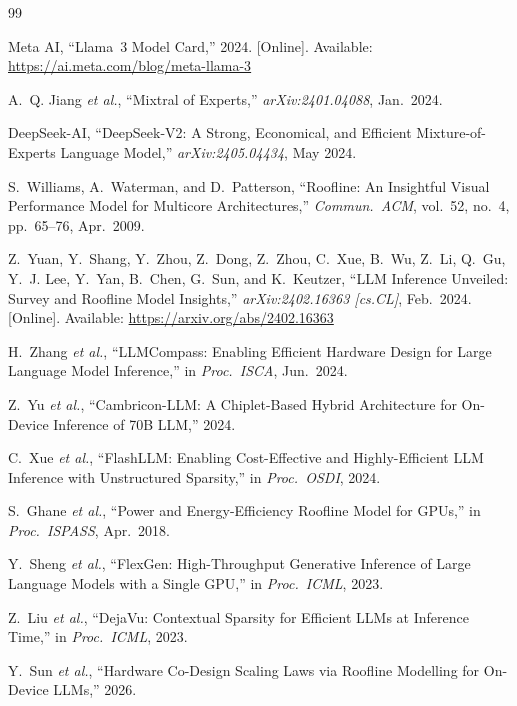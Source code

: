 \documentclass[journal]{IEEEtran}
\begin{document}
\begin{thebibliography}{99}

Meta AI, ``Llama~3 Model Card,'' 2024.
[Online]. Available: \url{https://ai.meta.com/blog/meta-llama-3}

A.~Q. Jiang \textit{et al.}, ``Mixtral of Experts,''
\textit{arXiv:2401.04088}, Jan.\ 2024.

DeepSeek-AI, ``DeepSeek-V2: A Strong, Economical, and Efficient
Mixture-of-Experts Language Model,''
\textit{arXiv:2405.04434}, May 2024.

S.~Williams, A.~Waterman, and D.~Patterson,
``Roofline: An Insightful Visual Performance Model for Multicore
Architectures,''
\textit{Commun.~ACM}, vol.~52, no.~4, pp.~65--76, Apr.\ 2009.

Z.~Yuan, Y.~Shang, Y.~Zhou, Z.~Dong, Z.~Zhou, C.~Xue, B.~Wu, Z.~Li,
Q.~Gu, Y.~J. Lee, Y.~Yan, B.~Chen, G.~Sun, and K.~Keutzer,
``LLM Inference Unveiled: Survey and Roofline Model Insights,''
\textit{arXiv:2402.16363 [cs.CL]}, Feb.\ 2024.
[Online]. Available: \url{https://arxiv.org/abs/2402.16363}

H.~Zhang \textit{et al.}, ``LLMCompass: Enabling Efficient Hardware
Design for Large Language Model Inference,''
in \textit{Proc.\ ISCA}, Jun.\ 2024.

Z.~Yu \textit{et al.}, ``Cambricon-LLM: A Chiplet-Based Hybrid
Architecture for On-Device Inference of 70B LLM,'' 2024.

C.~Xue \textit{et al.}, ``FlashLLM: Enabling Cost-Effective and
Highly-Efficient LLM Inference with Unstructured Sparsity,''
in \textit{Proc.\ OSDI}, 2024.

S.~Ghane \textit{et al.}, ``Power and Energy-Efficiency Roofline
Model for GPUs,'' in \textit{Proc.\ ISPASS}, Apr.\ 2018.

Y.~Sheng \textit{et al.}, ``FlexGen: High-Throughput Generative
Inference of Large Language Models with a Single GPU,''
in \textit{Proc.\ ICML}, 2023.

Z.~Liu \textit{et al.}, ``DejaVu: Contextual Sparsity for Efficient
LLMs at Inference Time,'' in \textit{Proc.\ ICML}, 2023.

Y.~Sun \textit{et al.}, ``Hardware Co-Design Scaling Laws via Roofline
Modelling for On-Device LLMs,'' 2026.


\end{thebibliography}
\end{document}
